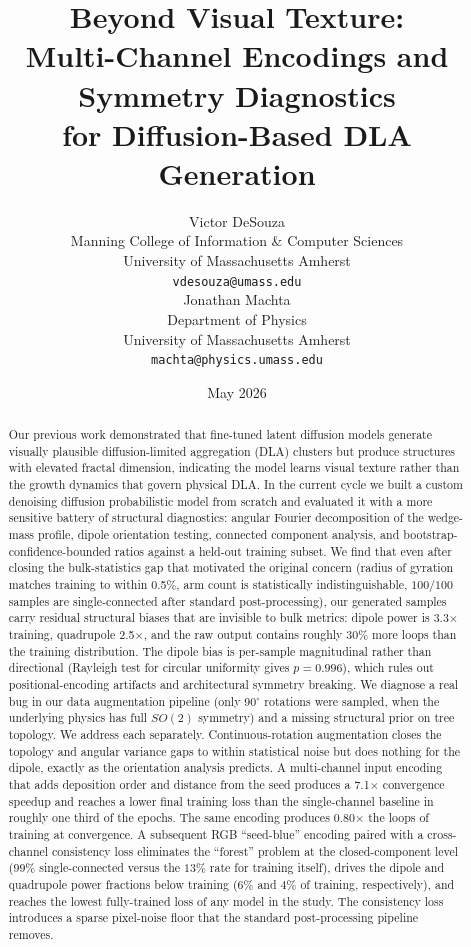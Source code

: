 \documentclass[11pt]{article}
\title{\vspace{-1.5em}Beyond Visual Texture:\\
Multi-Channel Encodings and Symmetry Diagnostics\\
for Diffusion-Based DLA Generation}
\author{
Victor DeSouza\\
Manning College of Information \& Computer Sciences\\
University of Massachusetts Amherst\\
\texttt{vdesouza@umass.edu}\\[6pt]
Jonathan Machta\\
Department of Physics\\
University of Massachusetts Amherst\\
\texttt{machta@physics.umass.edu}
}
\date{May 2026}
\begin{document}
\maketitle

\begin{abstract}
Our previous work demonstrated that fine-tuned latent diffusion models generate visually plausible diffusion-limited aggregation (DLA) clusters but produce structures with elevated fractal dimension, indicating the model learns visual texture rather than the growth dynamics that govern physical DLA. In the current cycle we built a custom denoising diffusion probabilistic model from scratch and evaluated it with a more sensitive battery of structural diagnostics: angular Fourier decomposition of the wedge-mass profile, dipole orientation testing, connected component analysis, and bootstrap-confidence-bounded ratios against a held-out training subset. We find that even after closing the bulk-statistics gap that motivated the original concern (radius of gyration matches training to within 0.5\%, arm count is statistically indistinguishable, $100/100$ samples are single-connected after standard post-processing), our generated samples carry residual structural biases that are invisible to bulk metrics: dipole power is 3.3$\times$ training, quadrupole 2.5$\times$, and the raw output contains roughly 30\% more loops than the training distribution. The dipole bias is per-sample magnitudinal rather than directional (Rayleigh test for circular uniformity gives $p=0.996$), which rules out positional-encoding artifacts and architectural symmetry breaking. We diagnose a real bug in our data augmentation pipeline (only 90$^{\circ}$ rotations were sampled, when the underlying physics has full $SO(2)$ symmetry) and a missing structural prior on tree topology. We address each separately. Continuous-rotation augmentation closes the topology and angular variance gaps to within statistical noise but does nothing for the dipole, exactly as the orientation analysis predicts. A multi-channel input encoding that adds deposition order and distance from the seed produces a 7.1$\times$ convergence speedup and reaches a lower final training loss than the single-channel baseline in roughly one third of the epochs. The same encoding produces 0.80$\times$ the loops of training at convergence. A subsequent RGB ``seed-blue'' encoding paired with a cross-channel consistency loss eliminates the ``forest'' problem at the closed-component level ($99\%$ single-connected versus the $13\%$ rate for training itself), drives the dipole and quadrupole power fractions below training ($6\%$ and $4\%$ of training, respectively), and reaches the lowest fully-trained loss of any model in the study. The consistency loss introduces a sparse pixel-noise floor that the standard post-processing pipeline removes.
\end{abstract}
\end{document}
